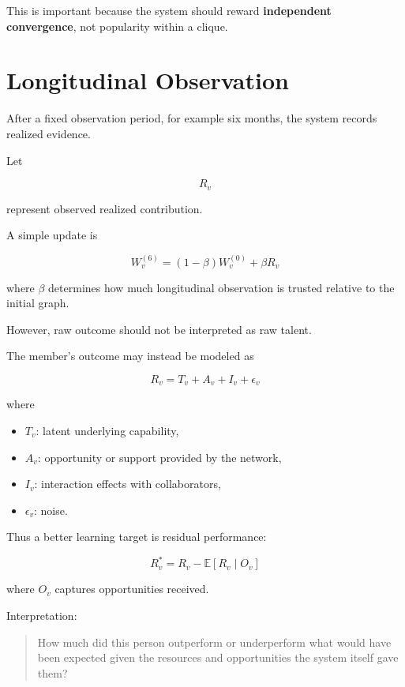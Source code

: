 \documentclass[11pt]{article}
\begin{document}
This is important because the system should reward
\textbf{independent convergence}, not popularity within a clique.

\section{Longitudinal Observation}

After a fixed observation period, for example six months, the system records
realized evidence.

Let

\[
R_v
\]

represent observed realized contribution.

A simple update is

\[
\boxed{
W_v^{(6)}
=
(1-\beta)W_v^{(0)}
+
\beta R_v
}
\]

where \(\beta\) determines how much longitudinal observation is trusted relative
to the initial graph.

However, raw outcome should not be interpreted as raw talent.

The member's outcome may instead be modeled as

\[
R_v
=
T_v
+
A_v
+
I_v
+
\epsilon_v
\]

where

\begin{itemize}
    \item \(T_v\): latent underlying capability,
    \item \(A_v\): opportunity or support provided by the network,
    \item \(I_v\): interaction effects with collaborators,
    \item \(\epsilon_v\): noise.
\end{itemize}

Thus a better learning target is residual performance:

\[
\boxed{
R_v^\ast
=
R_v -
\mathbb{E}[R_v \mid O_v]
}
\]

where \(O_v\) captures opportunities received.

Interpretation:

\begin{quote}
How much did this person outperform or underperform what would have been
expected given the resources and opportunities the system itself gave them?
\end{quote}

\end{document}
